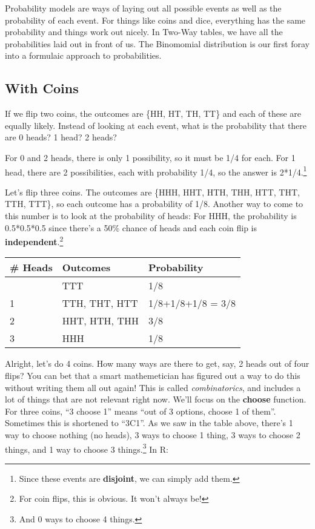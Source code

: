 \documentclass[
  letterpaper,
  DIV=11,
  numbers=noendperiod]{scrreprt}
\begin{document}
Probability models are ways of laying out all possible events as well as
the probability of each event. For things like coins and dice,
everything has the same probability and things work out nicely. In
Two-Way tables, we have all the probabilities laid out in front of us.
The Binomomial distribution is our first foray into a formulaic approach
to probabilities.

\hypertarget{with-coins}{%
\subsection{With Coins}\label{with-coins}}

If we flip two coins, the outcomes are \{HH, HT, TH, TT\} and each of
these are equally likely. Instead of looking at each event, what is the
probability that there are 0 heads? 1 head? 2 heads?

For 0 and 2 heads, there is only 1 possibility, so it must be 1/4 for
each. For 1 head, there are 2 possibilities, each with probability 1/4,
so the answer is 2*1/4.\footnote{Since these events are
  \textbf{disjoint}, we can simply add them.}

Let's flip three coins. The outcomes are \{HHH, HHT, HTH, THH, HTT, THT,
TTH, TTT\}, so each outcome has a probability of 1/8. Another way to
come to this number is to look at the probability of heads: For HHH, the
probability is 0.5*0.5*0.5 since there's a 50\% chance of heads and each
coin flip is \textbf{independent}.\footnote{For coin flips, this is
  obvious. It won't always be!}

\begin{longtable}[]{@{}lll@{}}
\toprule\noalign{}
\# Heads & Outcomes & Probability \\
\midrule\noalign{}
\endhead
\bottomrule\noalign{}
\endlastfoot
0 & TTT & 1/8 \\
1 & TTH, THT, HTT & 1/8+1/8+1/8 = 3/8 \\
2 & HHT, HTH, THH & 3/8 \\
3 & HHH & 1/8 \\
\end{longtable}

Alright, let's do 4 coins. How many ways are there to get, say, 2 heads
out of four flips? You can bet that a smart mathemetician has figured
out a way to do this without writing them all out again! This is called
\emph{combinatorics}, and includes a lot of things that are not relevant
right now. We'll focus on the \textbf{choose} function. For three coins,
``3 choose 1'' means ``out of 3 options, choose 1 of them''. Sometimes
this is shortened to ``3C1''. As we saw in the table above, there's 1
way to choose nothing (no heads), 3 ways to choose 1 thing, 3 ways to
choose 2 things, and 1 way to choose 3 things.\footnote{And 0 ways to
  choose 4 things.} In R:
\end{document}
